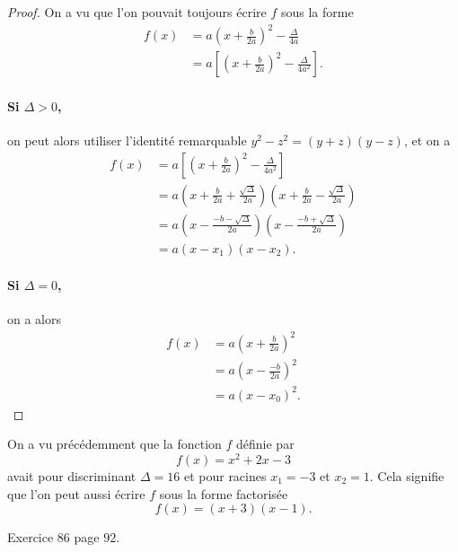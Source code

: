 \documentclass[11pt]{article}
\begin{document}
\begin{proof}
  On a vu que l'on pouvait toujours écrire $f$ sous la forme
\begin{align*}
  f(x) &= a\left( x+\frac{b}{2a} \right)^2-\frac{\Delta}{4a} \\
  &= a\left[ \left( x+\frac{b}{2a} \right)^2-\frac{\Delta}{4a^2} \right].
\end{align*}
\paragraph{Si $\Delta>0$,} on peut alors utiliser l'identité remarquable
$y^2-z^2=(y+z)(y-z)$, et on a
\begin{align*}
  f(x) &= a\left[ \left( x+\frac{b}{2a} \right)^2-\frac{\Delta}{4a^2} \right] \\
  &= a\left( x+\frac{b}{2a}+\frac{\sqrt\Delta}{2a} \right)\left(
  x+\frac{b}{2a}-\frac{\sqrt\Delta}{2a}\right) \\
  &= a\left( x-\frac{-b-\sqrt\Delta}{2a}\right)\left(
  x-\frac{-b+\sqrt\Delta}{2a}\right) \\
  &= a(x-x_1)(x-x_2).
\end{align*}
\paragraph{Si $\Delta=0$,} on a alors
\begin{align*}
  f(x) &= a\left(x+\frac{b}{2a}  \right)^2 \\
  &= a\left(x-\frac{-b}{2a}  \right)^2 \\
  &= a(x-x_0)^2.
\end{align*}
\end{proof}

\begin{exemple}
  On a vu précédemment que la fonction $f$ définie par
  \[
    f(x) = x^2+2x-3
  \]
  avait pour discriminant $\Delta=16$ et pour racines $x_1=-3$ et $x_2=1$. Cela
  signifie que l'on peut aussi écrire $f$ sous la forme factorisée
  \[
    f(x) = (x+3)(x-1).
  \]
\end{exemple}

\begin{exo}
  Exercice $86$ page $92$.
\end{exo}
\end{document}

